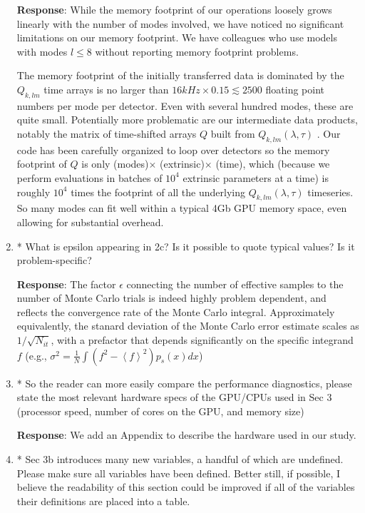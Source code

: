 \documentclass[onecolumn]{revtex4}
\newcommand{\E}[1]{{\left\langle #1 \right\rangle }}
\begin{document}
\begin{enumerate}
\noindent \textbf{Response}: While the memory footprint of our operations loosely grows linearly with the number of
modes involved, we have noticed no significant limitations on our memory footprint.  We have colleagues who use models with modes
$l \le 8$ without reporting memory footprint problems.   

The memory footprint of the initially transferred data is dominated by the $Q_{k,lm}$ time arrays is no larger than $16 kHz
\times 0.15  \lesssim 2500$ floating point numbers per mode per detector.  Even with several hundred modes, these are
quite small.
Potentially more problematic are our intermediate data products, notably the matrix of time-shifted arrays $Q$ built
from $Q_{k,lm}(\lambda,\tau)$ .  Our code has been carefully
organized to loop over detectors so the memory footprint of $Q$ is only (modes)$\times$ (extrinsic)$\times$ (time),
which (because we perform evaluations in batches of  $10^4$ extrinsic parameters at a time) is roughly $10^4$ times the
footprint of all the underlying $Q_{k,lm}(\lambda,\tau)$ timeseries.  So many modes can
fit well within a typical 4Gb GPU memory space, even allowing for substantial overhead.


\item * What is epsilon appearing in 2c? Is it possible to quote typical
values? Is it problem-specific?


\noindent \textbf{Response}:   The factor $\epsilon$ connecting the number of effective samples to the number of Monte
Carlo trials is indeed highly problem dependent, and reflects the convergence rate of the Monte Carlo integral.
Approximately equivalently, the stanard deviation of the Monte Carlo error estimate scales as $1/\sqrt{N_{it}}$, with a
prefactor  that  depends significantly on the specific integrand $f$ (e.g., $\sigma^2= \frac{1}{N}\int (f^2 - \E{f}^2) p_s(x)dx$)


\item * So the reader can more easily compare the performance diagnostics,
please state the most relevant hardware specs of the GPU/CPUs used in
Sec 3 (processor speed, number of cores on the GPU, and memory size)

\noindent \textbf{Response}:   We add an Appendix to describe the hardware used in our study.

\item * Sec 3b introduces many new variables, a handful of which are
undefined. Please make sure all variables have been defined. Better
still, if possible, I believe the readability of this section could be
improved if all of the variables their definitions are placed into a
table.


\end{enumerate}
\end{document}

